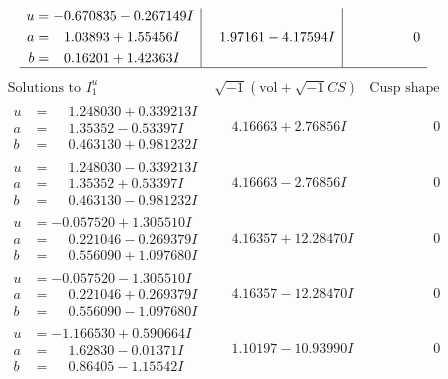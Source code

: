 \documentclass[1p]{elsarticle_modified}
\theoremstyle{definition}
\newcommand{\I}{\sqrt{-1}}
\begin{document}
$$\begin{array}{c|c|c}
\begin{aligned}
u &= -0.670835 - 0.267149 I \\
a &= \phantom{-}1.03893 + 1.55456 I \\
b &= \phantom{-}0.16201 + 1.42363 I\end{aligned}
 & \phantom{-}1.97161 - 4.17594 I & \phantom{-0.000000 } 0\\
 \hline 
 \end{array}$$\newpage$$\begin{array}{c|c|c}  
\text{Solutions to }I^u_{1}& \I (\text{vol} + \sqrt{-1}CS) & \text{Cusp shape}\\
 \hline 
\begin{aligned}
u &= \phantom{-}1.248030 + 0.339213 I \\
a &= \phantom{-}1.35352 - 0.53397 I \\
b &= \phantom{-}0.463130 + 0.981232 I\end{aligned}
 & \phantom{-}4.16663 + 2.76856 I & \phantom{-0.000000 } 0 \\ \hline\begin{aligned}
u &= \phantom{-}1.248030 - 0.339213 I \\
a &= \phantom{-}1.35352 + 0.53397 I \\
b &= \phantom{-}0.463130 - 0.981232 I\end{aligned}
 & \phantom{-}4.16663 - 2.76856 I & \phantom{-0.000000 } 0 \\ \hline\begin{aligned}
u &= -0.057520 + 1.305510 I \\
a &= \phantom{-}0.221046 - 0.269379 I \\
b &= \phantom{-}0.556090 + 1.097680 I\end{aligned}
 & \phantom{-}4.16357 + 12.28470 I & \phantom{-0.000000 } 0 \\ \hline\begin{aligned}
u &= -0.057520 - 1.305510 I \\
a &= \phantom{-}0.221046 + 0.269379 I \\
b &= \phantom{-}0.556090 - 1.097680 I\end{aligned}
 & \phantom{-}4.16357 - 12.28470 I & \phantom{-0.000000 } 0 \\ \hline\begin{aligned}
u &= -1.166530 + 0.590664 I \\
a &= \phantom{-}1.62830 - 0.01371 I \\
b &= \phantom{-}0.86405 - 1.15542 I\end{aligned}
 & \phantom{-}1.10197 - 10.93990 I & \phantom{-0.000000 } 0 \\ \hline\begin{aligned}

\end{aligned}
\end{array}$$
\end{document}
